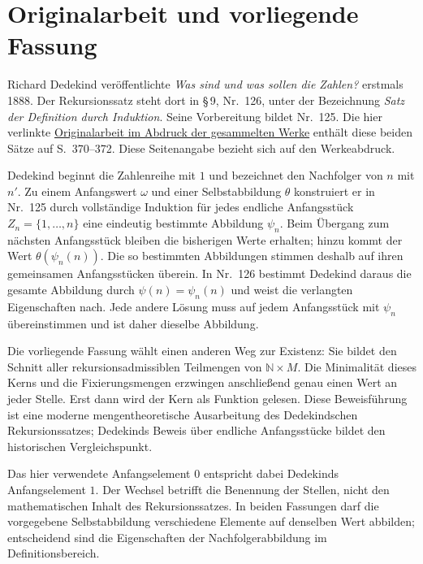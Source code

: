 \par{}
\section*{Originalarbeit und vorliegende Fassung}

Richard Dedekind veröffentlichte \emph{Was sind und was sollen die
Zahlen?} erstmals 1888. Der Rekursionssatz steht dort in \S\,9,
Nr.~126, unter der Bezeichnung \emph{Satz der Definition durch
Induktion}. Seine Vorbereitung bildet Nr.~125. Die hier verlinkte
\href{https://rcin.org.pl/Content/142188/PDF/WA35_176312_15883-3_Art6.pdf\#page=36}%
  {Originalarbeit im Abdruck der gesammelten Werke}
enthält diese beiden Sätze auf S.~370--372. Diese Seitenangabe
bezieht sich auf den Werkeabdruck.

Dedekind beginnt die Zahlenreihe mit \(1\) und bezeichnet den
Nachfolger von \(n\) mit \(n'\). Zu einem Anfangswert \(\omega\)
und einer Selbstabbildung \(\theta\) konstruiert er in Nr.~125
durch vollständige Induktion für jedes endliche Anfangsstück
\(Z_n=\{1,\ldots,n\}\) eine eindeutig bestimmte Abbildung
\(\psi_n\). Beim Übergang zum nächsten Anfangsstück bleiben
die bisherigen Werte erhalten; hinzu kommt der Wert
\(\theta(\psi_n(n))\). Die so bestimmten Abbildungen stimmen
deshalb auf ihren gemeinsamen Anfangsstücken überein.
In Nr.~126 bestimmt Dedekind daraus die gesamte Abbildung durch
\(\psi(n)=\psi_n(n)\) und weist die verlangten Eigenschaften
nach. Jede andere Lösung muss auf jedem Anfangsstück mit
\(\psi_n\) übereinstimmen und ist daher dieselbe Abbildung.

Die vorliegende Fassung wählt einen anderen Weg zur Existenz:
Sie bildet den Schnitt aller rekursionsadmissiblen Teilmengen
von \(\mathbb N\times M\). Die Minimalität dieses Kerns und
die Fixierungsmengen erzwingen anschließend genau einen Wert
an jeder Stelle. Erst dann wird der Kern als Funktion gelesen.
Diese Beweisführung ist eine moderne mengentheoretische
Ausarbeitung des Dedekindschen Rekursionssatzes; Dedekinds
Beweis über endliche Anfangsstücke bildet den historischen
Vergleichspunkt.

Das hier verwendete Anfangselement \(0\) entspricht dabei
Dedekinds Anfangselement \(1\). Der Wechsel betrifft die
Benennung der Stellen, nicht den mathematischen Inhalt des
Rekursionssatzes. In beiden Fassungen darf die vorgegebene
Selbstabbildung verschiedene Elemente auf denselben Wert
abbilden; entscheidend sind die Eigenschaften der
Nachfolgerabbildung im Definitionsbereich.
